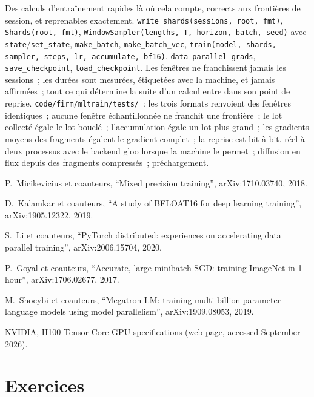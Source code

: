 \begin{build}
 Des calculs d'entraînement rapides là où cela compte, corrects aux frontières de session, et reprenables exactement.
 \texttt{write\_shards(sessions, root, fmt)}, \texttt{Shards(root, fmt)},
\texttt{WindowSampler(lengths, T, horizon, batch, seed)} avec \texttt{state}/\texttt{set\_state}, \texttt{make\_batch}, \texttt{make\_batch\_vec},
\texttt{train(model, shards, sampler, steps, lr, accumulate, bf16)}, \texttt{data\_parallel\_grads}, \texttt{save\_checkpoint},
\texttt{load\_checkpoint}.
 Les fenêtres ne franchissent jamais les sessions~; les durées sont mesurées, étiquetées avec la machine, et jamais affirmées~; tout ce qui
détermine la suite d'un calcul entre dans son point de reprise.
 \texttt{code/firm/mltrain/tests/}~: les trois formats renvoient des fenêtres identiques~; aucune fenêtre échantillonnée ne franchit
une frontière~; le lot collecté égale le lot bouclé~; l'accumulation égale un lot plus grand~; les gradients moyens des fragments égalent le
gradient complet~; la reprise est bit à bit.
  réel à deux processus avec le backend gloo lorsque la machine le permet~; diffusion en flux depuis des
fragments compressés~; préchargement.
\end{build}

\begin{omsources}
\item P.~Micikevicius et coauteurs, ``Mixed precision training'', arXiv:1710.03740, 2018.
\item D.~Kalamkar et coauteurs, ``A study of BFLOAT16 for deep learning training'', arXiv:1905.12322, 2019.
\item S.~Li et coauteurs, ``PyTorch distributed: experiences on accelerating data parallel training'', arXiv:2006.15704, 2020.
\item P.~Goyal et coauteurs, ``Accurate, large minibatch SGD: training ImageNet in 1 hour'', arXiv:1706.02677, 2017.
\item M.~Shoeybi et coauteurs, ``Megatron-LM: training multi-billion parameter language models using model parallelism'',
arXiv:1909.08053, 2019.
\item NVIDIA, H100 Tensor Core GPU specifications (web page, accessed September 2026).
\end{omsources}

\section{Exercices}

